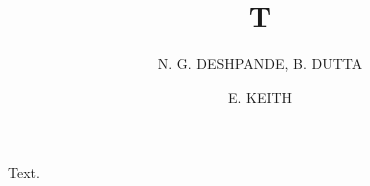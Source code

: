 
\title{T}
\author{N. G. DESHPANDE, B. DUTTA}
\address{Institute of Theoretical Science, University of Oregon}
\author{E. KEITH}
\address{Department of Physics, University of California}
\maketitle
{}
Text.


